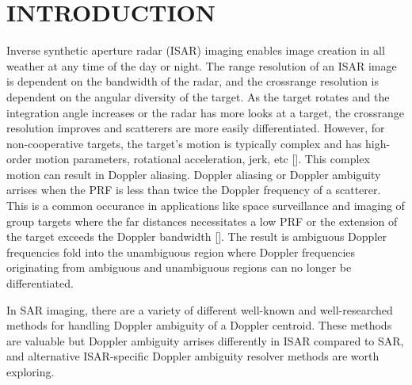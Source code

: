\section{INTRODUCTION}
\label{sec:intro}  %



Inverse synthetic aperture radar (ISAR) imaging enables image creation in all weather at any time of the day or night. The range resolution of an ISAR image is dependent on the bandwidth of the radar, and the crossrange resolution is dependent on the angular diversity of the target. As the target rotates and the integration angle increases or the radar has more looks at a target, the crossrange resolution improves and scatterers are more easily differentiated. However, for non-cooperative targets, the target's motion is typically complex and has high-order motion parameters, rotational acceleration, jerk, etc []. This complex motion can result in Doppler aliasing. Doppler aliasing or Doppler ambiguity arrises when the PRF is less than twice the Doppler frequency of a scatterer. This is a common occurance in applications like space surveillance and imaging of group targets where the far distances necessitates a low PRF or the extension of the target exceeds the Doppler bandwidth []. The result is ambiguous Doppler frequencies fold into the unambiguous region where Doppler frequencies originating from ambiguous and unambiguous regions can no longer be differentiated. 




In SAR imaging, there are a variety of different well-known and well-researched methods for handling Doppler ambiguity of a Doppler centroid. These methods are valuable but Doppler ambiguity arrises differently in ISAR compared to SAR, and alternative ISAR-specific Doppler ambiguity resolver methods are worth exploring. 

